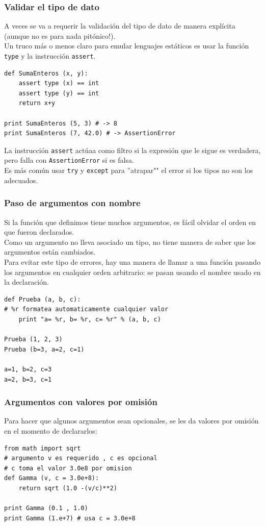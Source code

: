 \begin{frame}[fragile]
\frametitle{Validar el tipo de dato}
A veces se va a requerir la validación del tipo de dato de manera explícita (aunque no es para nada pitónico!).
\\
\medskip
Un truco más o menos claro para emular lenguajes estáticos es usar la función \texttt{type} y la instrucción \texttt{assert}.
\end{frame}
\begin{frame}[fragile]
\begin{verbatim}
def SumaEnteros (x, y):
    assert type (x) == int
    assert type (y) == int
    return x+y
    
print SumaEnteros (5, 3) # -> 8
print SumaEnteros (7, 42.0) # -> AssertionError
\end{verbatim}
La instrucción \texttt{assert} actúaa como filtro si la expresión que le sigue es verdadera, pero falla con \texttt{AssertionError} si es falsa.
\\
\medskip
Es más común usar \texttt{try} y \texttt{except} para ''atrapar"" el error si los tipos no son los adecuados.
\end{frame}
\begin{frame}
\frametitle{Paso de argumentos con nombre}
Si la función que definimos tiene muchos argumentos, es fácil olvidar el orden en que fueron declarados.
\\
\medskip
Como un argumento no lleva asociado un tipo, \python no tiene manera de saber que los argumentos están cambiados.
\\
\medskip
Para evitar este tipo de errores, hay una manera de llamar a una función pasando los argumentos en cualquier orden arbitrario: se pasan usando el nombre usado en la declaración.
\end{frame}
\begin{frame}[fragile]
\begin{verbatim}
def Prueba (a, b, c):
# %r formatea automaticamente cualquier valor
    print "a= %r, b= %r, c= %r" % (a, b, c)

Prueba (1, 2, 3)
Prueba (b=3, a=2, c=1)

a=1, b=2, c=3
a=2, b=3, c=1
\end{verbatim}
\end{frame}
\begin{frame}[fragile]
\frametitle{Argumentos con valores por omisión}
Para hacer que algunos argumentos sean opcionales, se les da valores por omisión en el momento de declararlos:
\begin{verbatim}
from math import sqrt
# argumento v es requerido , c es opcional
# c toma el valor 3.0e8 por omision
def Gamma (v, c = 3.0e+8):
    return sqrt (1.0 -(v/c)**2)

print Gamma (0.1 , 1.0)
print Gamma (1.e+7) # usa c = 3.0e+8
\end{verbatim}
\end{frame}
